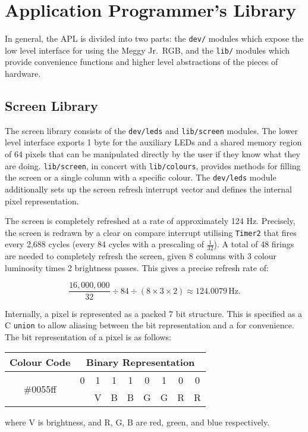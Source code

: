\documentclass[a4paper,10pt]{article}
\newcommand\meggyjr{Meggy Jr.\ RGB}
\begin{document}
\section*{Application Programmer's Library}

In general, the APL is divided into two parts: the \texttt{dev/} modules which
expose the low level interface for using the \meggyjr, and the \texttt{lib/}
modules which provide convenience functions and higher level abstractions of
the pieces of hardware.

\subsection*{Screen Library}
\label{sub:Screen Library}

The screen library consists of the \texttt{dev/leds} and \texttt{lib/screen}
modules. The lower level interface exports 1 byte for the auxiliary LEDs and a
shared memory region of 64 pixels that can be manipulated directly by the user
if they know what they are doing. \texttt{lib/screen}, in concert with
\texttt{lib/colours}, provides methods for filling the screen or a single
column with a specific colour. The \texttt{dev/leds} module additionally sets
up the screen refresh interrupt vector and defines the internal pixel
representation.

The screen is completely refreshed at a rate of approximately 124\thinspace
Hz. Precisely, the screen is redrawn by a clear on compare interrupt utilising
\texttt{Timer2} that fires every 2,688 cycles (every 84 cycles with a
prescaling of $\frac{1}{32}$). A total of 48 firings are needed to completely
refresh the screen, given 8 columns with 3 colour luminosity times 2
brightness passes.  This gives a precise refresh rate of:

\[
  \frac{16,000,000}{32} \div 84 \div (8 \times 3 \times 2) \approx
  124.0079\,\mathrm{Hz}.
\]

Internally, a pixel is represented as a packed 7 bit structure. This is
specified as a C \lstinline!union! to allow aliasing between the bit
representation and a for convenience. The bit
representation of a pixel is as follows:

\begin{center}
\begin{tabular}{ccccccccc}
\toprule
Colour Code & \multicolumn{8}{c}{Binary Representation}\tabularnewline
\midrule
 \multirow{2}{*}{\#0055ff} & 0 & 1 & 1 & 1 & 0 & 1 & 0 & 0\tabularnewline
 &  & V & B & B & G & G & R & R\tabularnewline
\bottomrule
\end{tabular}
\end{center}
where V is brightness, and R, G, B are red, green, and blue respectively.
\end{document}
